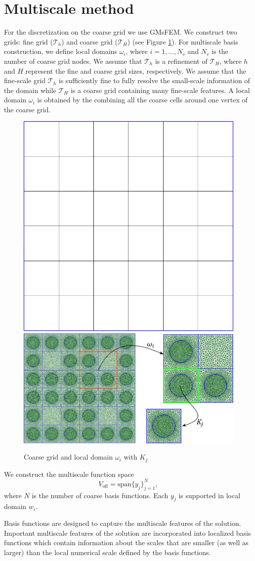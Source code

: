 \documentclass[10pt]{article}
\begin{document}
\section{Multiscale method}
For the discretization on the coarse grid we use GMsFEM.
We construct two grids: fine grid ($\mathcal{T}_h$) and coarse grid ($\mathcal{T}_H$) (see Figure \ref{p1}). 
For multiscale basis construction, we define local domains $\omega_i$, where $i = 1,...,N_v$ and $N_v$ is the number of coarse grid nodes.
We assume that $\mathcal{T}_h$ is a refinement of $\mathcal{T}_H$, where $h$ and $H$ represent the fine and coarse grid sizes, respectively. 
We assume that the fine-scale grid $\mathcal{T}_h$ is sufficiently fine to fully resolve the small-scale information of the domain  while $\mathcal{T}_H$ is a coarse grid containing many fine-scale features.
A local domain $\omega_i$ is obtained by the combining all the coarse cells around one vertex of the coarse grid. 

\begin{figure}[h!]
\centering
\includegraphics[width=0.3\linewidth]{coarse_grid.png}
\hspace{2em}
\includegraphics[width=0.57\linewidth]{omega.png} 
\caption{Coarse grid and local domain $\omega_i$ with $K_j$}
\label{p1}
\end{figure} 

We construct the multiscale function space
\[
{V}_{\text{off}} = \mbox{span} \{ y_j \}_{j=1}^{N},
\]
where $N$ is the number of coarse basis functions.
Each $y_j$ is supported in local domain $w_i$.

Basis functions are designed to capture the multiscale features of the solution. 
Important multiscale features of the solution are incorporated into localized basis functions which contain information about the scales that are smaller (as well as larger) than the local numerical scale defined by the basis functions. 
\end{document}
